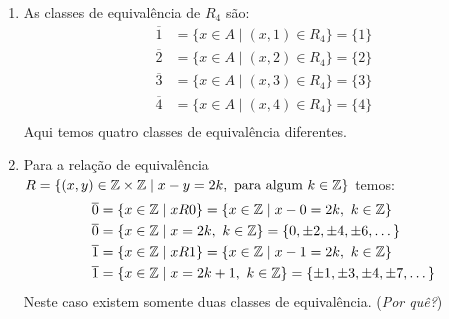 \begin{exemplos}
\begin{enumerate}[label={\arabic*})]
        \item As classes de equivalência de $R_4$ são:
        \begin{align*}
            \overline{1} &= \{x \in A \mid (x,1) \in R_4\} = \{1\}\\
            \overline{2} &= \{x \in A \mid (x,2) \in R_4\} = \{2\}\\
            \overline{3} &= \{x \in A \mid (x,3) \in R_4\} = \{3\}\\
            \overline{4} &= \{x \in A \mid (x,4) \in R_4\} = \{4\}\\
        \end{align*}
        Aqui temos quatro classes de equivalência diferentes.

        \item Para a relação de equivalência $R = \{(x,y)\in \mathbb{Z} \times \mathbb{Z} \mid x - y = 2k, \mbox{ para algum } k \in \mathbb{Z}\}$ temos:
        \begin{align*}
            \overline{0} &= \{x \in \mathbb{Z} \mid xR0 \} = \{x \in \mathbb{Z} \mid x - 0 = 2k,\ k \in \mathbb{Z}\} \\
            \overline{0} &= \{x \in \mathbb{Z} \mid x = 2k,\ k \in \mathbb{Z}\} = \{0, \pm 2, \pm 4, \pm 6, \dots\}\\
            \overline{1} &= \{x \in \mathbb{Z} \mid xR1 \} = \{x \in \mathbb{Z} \mid x - 1 = 2k,\ k \in \mathbb{Z}\} \\
            \overline{1} &= \{x \in \mathbb{Z} \mid x = 2k + 1,\ k \in \mathbb{Z}\} = \{\pm 1, \pm 3, \pm 4, \pm 7, \dots\}\\
        \end{align*}
        Neste caso existem somente duas classes de equivalência. (\textit{Por quê?})
    \end{enumerate}
\end{exemplos}

